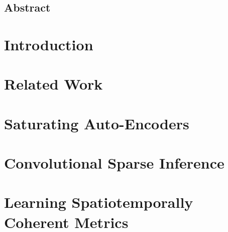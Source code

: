 \documentclass[12pt,letterpaper]{report}
\begin{document}
\section*{Abstract}

\newpage
\tableofcontents
\cleardoublepage
{}
\listoffigures
\newpage

\listoftables{}
\newpage


\chapter{Introduction} 
\label{chaper:introduction} 
\chapter{Related Work}
\label{chapter:related_work}
\chapter{Saturating Auto-Encoders}
\label{chapter:SATAE}

\chapter{Convolutional Sparse Inference}
\label{chapter:LISTA} 
 
\chapter{Learning Spatiotemporally Coherent Metrics}
\label{chapter:slow} 

\end{document}

